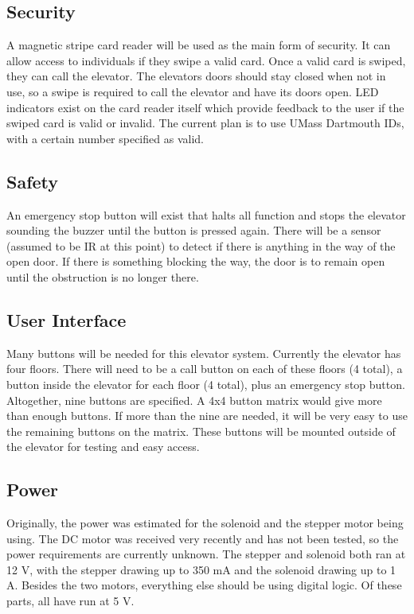 \documentclass{article}
\begin{document}
	    \subsection{Security}
	    A magnetic stripe card reader will be used as the main form of security. It can allow access to individuals if they swipe a valid card. Once a valid card is swiped, they can call the elevator. The elevators doors should stay closed when not in use, so a swipe is required to call the elevator and have its doors open. LED indicators exist on the card reader itself which provide feedback to the user if the swiped card is valid or invalid. The current plan is to use UMass Dartmouth IDs, with a certain number specified as valid.
	    
	    \subsection{Safety}
	    An emergency stop button will exist that halts all function and stops the elevator sounding the buzzer until the button is pressed again. There will be a sensor (assumed to be IR at this point) to detect if there is anything in the way of the open door. If there is something blocking the way, the door is to remain open until the obstruction is no longer there.
	    
	    \subsection{User Interface}
	    Many buttons will be needed for this elevator system. Currently the elevator has four floors. There will need to be a call button on each of these floors (4 total), a button inside the elevator for each floor (4 total), plus an emergency stop button. Altogether, nine buttons are specified. A 4x4 button matrix would give more than enough buttons. If more than the nine are needed, it will be very easy to use the remaining buttons on the matrix. These buttons will be mounted outside of the elevator for testing and easy access.
	    
	    \subsection{Power}
	    Originally, the power was estimated for the solenoid and the stepper motor being using. The DC motor was received very recently and has not been tested, so the power requirements are currently unknown. The stepper and solenoid both ran at 12 V, with the stepper drawing up to 350 mA and the solenoid drawing up to 1 A. Besides the two motors, everything else should be using digital logic. Of these parts, all have run at 5 V.
\end{document}

